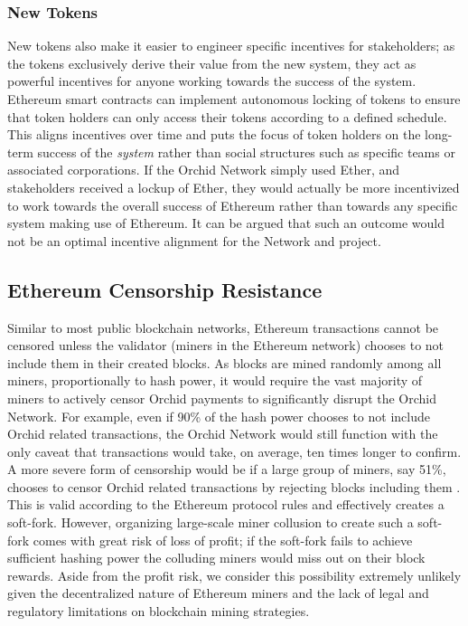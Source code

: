 \subsubsection{New Tokens}
New tokens also make it easier to engineer specific incentives for stakeholders; as the tokens exclusively derive their value from the new system, they act as powerful incentives for anyone working towards the success of the system. Ethereum smart contracts can implement autonomous locking of tokens to ensure that token holders can only access their tokens according to a defined schedule. This aligns incentives over time and puts the focus of token holders on the long-term success of the \emph{system} rather than social structures such as specific teams or associated corporations. If the Orchid Network simply used Ether, and stakeholders received a lockup of Ether, they would actually be more incentivized to work towards the overall success of Ethereum rather than towards any specific system making use of Ethereum. It can be argued that such an outcome would not be an optimal incentive alignment for the \Orchid{} Network and project.

\subsection{Ethereum Censorship Resistance}

Similar to most public blockchain networks, Ethereum transactions cannot be censored unless the validator (miners in the Ethereum network) chooses to not include them in their created blocks. As blocks are mined randomly among all miners, proportionally to hash power, it would require the vast majority of miners to actively censor Orchid payments to significantly disrupt the Orchid Network. For example, even if 90\% of the hash power chooses to not include Orchid related transactions, the Orchid Network would still function with the only caveat that transactions would take, on average, ten times longer to confirm. A more severe form of censorship would be if a large group of miners, say 51\%, chooses to censor Orchid related transactions by rejecting blocks including them \cite{BitcoinEconomics}. This is valid according to the Ethereum protocol rules and effectively creates a soft-fork. However, organizing large-scale miner collusion to create such a soft-fork comes with great risk of loss of profit; if the soft-fork fails to achieve sufficient hashing power the colluding miners would miss out on their block rewards. Aside from the profit risk, we consider this possibility extremely unlikely given the decentralized nature of Ethereum miners and the lack of legal and regulatory limitations on blockchain mining strategies.

